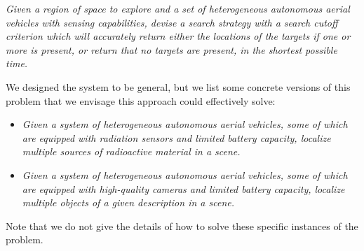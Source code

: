 \textit{Given a region of space to explore and a set of heterogeneous autonomous aerial vehicles with sensing capabilities, devise a search strategy with a search cutoff criterion which will accurately return either the locations of the targets if one or more is present, or return that no targets are present, in the shortest possible time.} \par

We designed the system to be general, but we list some concrete versions of this problem that we envisage this approach could effectively solve:
\begin{itemize}
    \item \textit{Given a system of heterogeneous autonomous aerial vehicles, some of which are equipped with radiation sensors and limited battery capacity, localize multiple sources of radioactive material in a scene.}
    \item \textit{Given a system of heterogeneous autonomous aerial vehicles, some of which are equipped with high-quality cameras and limited battery capacity, localize multiple objects of a given description in a scene.}
\end{itemize}
Note that we do not give the details of how to solve these specific instances of the problem.
\par


